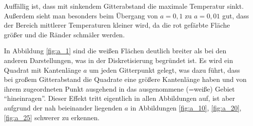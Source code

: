 \documentclass[10pt,a4paper]{article}
\begin{document}
%
%
%
%

Auffällig ist, dass mit sinkendem Gitterabstand die maximale Temperatur sinkt. Außerdem sieht man besonders beim Übergang von $a=0,1$  zu $a=0,01$ gut, dass der Bereich mittlerer Temperaturen kleiner wird, da die rot gefärbte Fläche größer und die Ränder schmäler werden.

In Abbildung \ref{fig:a_1} sind die weißen Flächen deutlich breiter als bei den anderen Darstellungen, was in der Diskretisierung begründet ist. Es wird ein Quadrat mit Kantenlänge $a$ um jeden Gitterpunkt gelegt, was dazu führt, dass bei großem Gitterabstand die Quadrate eine größere Kantenlänge haben und von ihrem zugeordneten Punkt ausgehend in das ausgenommene (=weiße) Gebiet "`hineinragen"'. Dieser Effekt tritt eigentlich in allen Abbildungen auf, ist aber aufgrund der nah beieinander liegenden $a$ in Abbildungen \ref{fig:a_10}, \ref{fig:a_20}, \ref{fig:a_25} schwerer zu erkennen.
\end{document}
